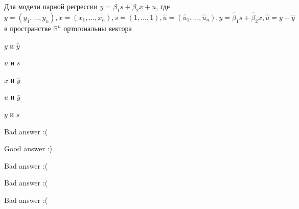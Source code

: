 
\begin{question}
Для модели парной регрессии \(y = \beta_1 s + \beta_2 x + u\),
где \(y = (y_1, \ldots, y_n), x = (x_1, \ldots, x_n),
s = (1, \ldots, 1), \hat u = (\hat u_1, \ldots, \hat u_n), \hat y = \hat \beta_1 s + \hat \beta_2 x, \hat u = y - \hat y\) в пространстве \(\mathbb R^n\) ортогональны вектора
\begin{answerlist}
  \item \(y\) и \(\hat y\)
  \item \(\hat u\) и \(s\)
  \item \(x\) и \(\hat y\)
  \item \(u\) и \(\hat y\)
  \item \(y\) и \(s\)
\end{answerlist}
\end{question}

\begin{solution}
\begin{answerlist}
  \item Bad answer :(
  \item Good answer :)
  \item Bad answer :(
  \item Bad answer :(
  \item Bad answer :(
\end{answerlist}
\end{solution}


